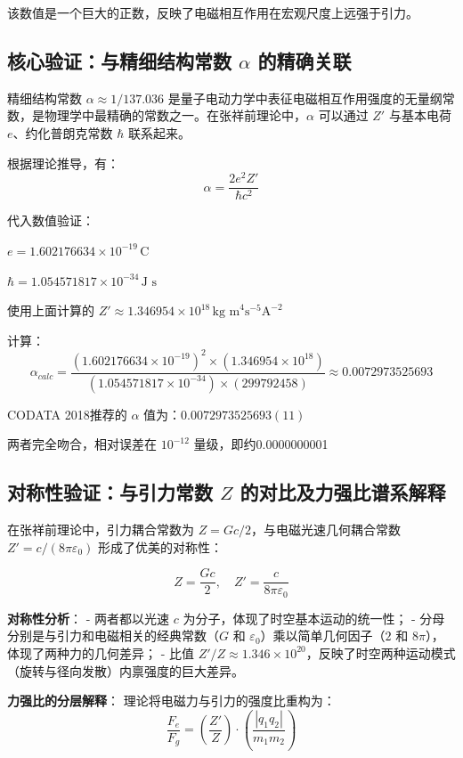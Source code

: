 \documentclass[a4paper,12pt]{article}
\theoremstyle{plain}
\begin{document}
该数值是一个巨大的正数，反映了电磁相互作用在宏观尺度上远强于引力。

\subsection{核心验证：与精细结构常数 $\alpha$ 的精确关联}
精细结构常数 $\alpha \approx 1/137.036$ 是量子电动力学中表征电磁相互作用强度的无量纲常数，是物理学中最精确的常数之一。在张祥前理论中，$\alpha$ 可以通过 $Z'$ 与基本电荷 $e$、约化普朗克常数 $\hbar$ 联系起来。

根据理论推导，有：
$$\alpha = \frac{2e^2 Z'}{\hbar c^2}$$ 

代入数值验证：

$e = 1.602176634 \times 10^{-19} \, \text{C}$

$\hbar = 1.054571817 \times 10^{-34} \, \text{J s}$

使用上面计算的 $Z' \approx 1.346954 \times 10^{18} \, \text{kg m}^4 \text{s}^{-5} \text{A}^{-2}$

计算：
$$\alpha_{calc} = \frac{(1.602176634 \times 10^{-19})^2 \times (1.346954 \times 10^{18})}{(1.054571817 \times 10^{-34}) \times (299792458)} \approx 0.0072973525693$$ 

CODATA 2018推荐的 $\alpha$ 值为：$0.0072973525693(11)$

两者完全吻合，相对误差在 $10^{-12}$ 量级，即约0.0000000001%

\subsection{对称性验证：与引力常数 $Z$ 的对比及力强比谱系解释}
在张祥前理论中，引力耦合常数为 $Z = G c / 2$，与电磁光速几何耦合常数 $Z' = c/(8\pi\varepsilon_0)$ 形成了优美的对称性：

$$Z = \frac{G c}{2}, \quad Z' = \frac{c}{8\pi\varepsilon_0}$$ 

\textbf{对称性分析}：
- 两者都以光速 $c$ 为分子，体现了时空基本运动的统一性；
- 分母分别是与引力和电磁相关的经典常数（$G$ 和 $\varepsilon_0$）乘以简单几何因子（$2$ 和 $8\pi$），体现了两种力的几何差异；
- 比值 $Z'/Z \approx 1.346\times10^{20}$，反映了时空两种运动模式（旋转与径向发散）内禀强度的巨大差异。

\textbf{力强比的分层解释}：
理论将电磁力与引力的强度比重构为：
$$\frac{F_e}{F_g} = \left( \frac{Z'}{Z} \right) \cdot \left( \frac{|q_1 q_2|}{m_1 m_2} \right)$$ 
\end{document}

